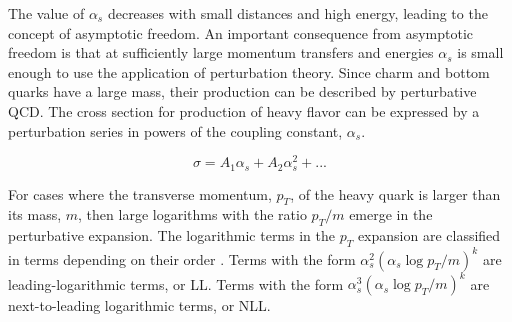 The value of  $\alpha_{s}$ decreases with small distances and high energy, leading to the concept of asymptotic freedom. An important consequence from asymptotic freedom is that at sufficiently large momentum transfers and energies $\alpha_{s}$ is small enough to use the application of perturbation theory. Since charm and bottom quarks have a large mass, their production can be described by perturbative QCD. The cross section for production of heavy flavor can be expressed by a perturbation series in powers of the coupling constant, $\alpha_{s}$.



\begin{equation}
\sigma = A_{1} \alpha_{s} + A_{2} \alpha_{s}^{2} + ...
\end{equation}

For cases where the transverse momentum, $p_{T}$, of the heavy quark is larger than its mass, $m$, then large logarithms with the ratio $p_{T}/m$ emerge in the perturbative expansion. The logarithmic terms in the $p_{T}$ expansion are classified in terms depending on their order \cite{Cacciari:1998it}. Terms with the form $\alpha_{s}^{2}(\alpha_{s} \log p_{T} / m)^{k} $ are leading-logarithmic terms, or LL. Terms with the form $\alpha_{s}^{3}(\alpha_{s} \log p_{T} / m)^{k} $ are next-to-leading logarithmic terms, or NLL.

